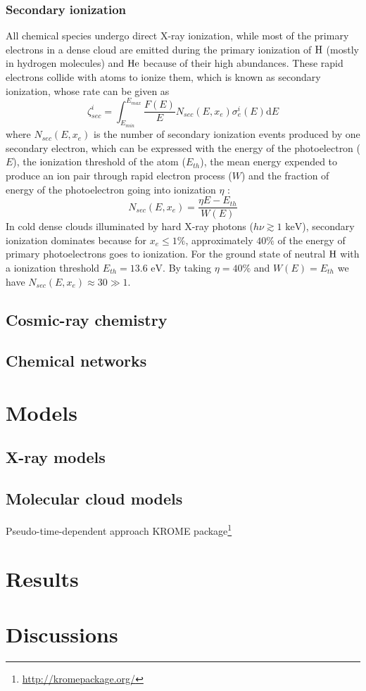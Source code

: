 \documentclass[twocolumn]{aastex62}
\begin{document}
	\subsubsection{Secondary ionization}
	All chemical species undergo direct X-ray ionization, while most of the primary electrons in a dense cloud are emitted during the primary ionization of $\ce{H}$ (mostly in hydrogen molecules) and $\ce{He}$ because of their high abundances. These rapid electrons collide with atoms to ionize them, which is known as secondary ionization, whose rate can be given as \citep{Maloney1996, Stauber2005}
	$$
	\zeta^i_{sec}=\int_{E_{min}}^{E_{max}}\frac{F(E)}{E}N_{sec}(E,x_e)\sigma^i_e(E)\text{d}E
	$$
	where $N_{sec}(E,x_e)$ is the number of secondary ionization events produced by one secondary electron, which can be expressed with the energy of the photoelectron ($E$), the ionization threshold of the atom ($E_{th}$), the mean energy expended to produce an ion pair through rapid electron process ($W$) and the fraction of energy of the photoelectron going into ionization $\eta$ :
	$$
	N_{sec}(E,x_e)=\frac{\eta E-E_{th}}{W(E)}
	$$
	In cold dense clouds illuminated by hard X-ray photons ($h\nu\gtrsim1\text{ keV}$), secondary ionization dominates because for $x_e\le1\%$, approximately $40\%$ of the energy of primary photoelectrons goes to ionization. For the ground state of neutral $\ce{H}$ with a ionization threshold $E_{th}=13.6\text{ eV}$. By taking $\eta=40\%$ and $W(E)=E_{th}$ we have $N_{sec}(E,x_e)\approx30\gg1$. 
	\subsection{Cosmic-ray chemistry}
	\subsection{Chemical networks}
	
	\section{Models}
	\subsection{X-ray models}
	\subsection{Molecular cloud models}
	Pseudo-time-dependent approach
	KROME package\footnote{\url{http://kromepackage.org/}} \citep{Grassi2014}
	
	\section{Results}
	
	\section{Discussions}
	

	
\end{document}
